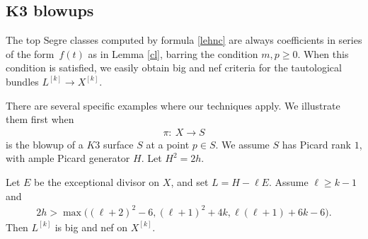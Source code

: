 \subsection[K3 blowups]{$\boldsymbol{K3}$ blowups}
The top Segre classes computed by formula \eqref{lehnc} are always coefficients in series of the form~$f(t)$ as in Lemma \ref{cl}, barring the condition $m, p\geq 0$. When this condition is satisfied, we easily obtain big and nef criteria for the tautological bundles $L^{[k]}\to X^{[k]}$.

There are several specific examples where our techniques apply. We illustrate them first when
\begin{gather*}
\pi\colon\ X\to S
\end{gather*}
is the blowup of a $K3$ surface $S$ at a point $p\in S$. We assume
$S$ has Picard rank $1$, with ample Picard generator $H$. Let $H^2=2h$.

\begin{Theorem}\label{blok}
Let $E$ be the exceptional divisor on $X$, and set $L=H-\ell E$. Assume $\ell\geq k-1$ and
\begin{gather*}
2h>\max \bigl((\ell+2)^2-6, (\ell+1)^2+4k, \ell(\ell+1)+6k-6\bigr).
\end{gather*}
Then $L^{[k]}$ is big and nef on $X^{[k]}$.
\end{Theorem}

